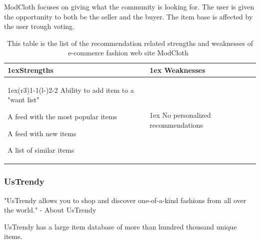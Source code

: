    ModCloth focuses on giving what the community is looking for.
    The user is given the opportunity to both be the seller and the buyer.
    The item base is affected by the user trough voting.
    \begin{table}[H]
            \centering
            \begin{tabularx}{\linewidth}{>{\parskip1ex}X@{\kern4\tabcolsep}>{\parskip1ex}X}
                \toprule
                \hfil\bfseries Strengths
                &
                \hfil\bfseries Weaknesses
                \\\cmidrule(r{3\tabcolsep}){1-1}\cmidrule(l{-\tabcolsep}){2-2}
                Ability to add item to a "want list" \par
                A feed with the most popular items \par
                A feed with new items \par
                A list of similar items \par
                &
                No personalized recommendations \par
                \\ \bottomrule
        \end{tabularx}
        \caption[Recommendation related strengths and weaknesses of
        ModCloth~\cite{modcloth}]{This table is the list of the recommendation
        related strengths and weaknesses of e-commerce fashion web site
        ModCloth~\cite{modcloth}}
        \label{table:ecommenreceModCloth}
    \end{table}

\subsubsection{UsTrendy} %
\label{par:ustrendy}
    "UsTrendy allows you to shop and discover one-of-a-kind fashions from all over the world." - About UsTrendy~\cite{UsTrendy}

    UsTrendy has a large item database of more than hundred thousand unique items.


